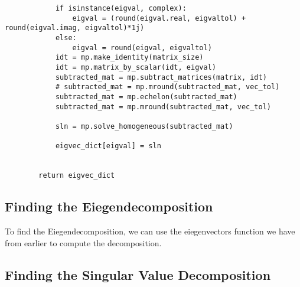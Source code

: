 \documentclass[12pt, a4paper]{article}
\begin{document}
\begin{lstlisting}
            if isinstance(eigval, complex):
                eigval = (round(eigval.real, eigvaltol) + round(eigval.imag, eigvaltol)*1j)
            else:
                eigval = round(eigval, eigvaltol)
            idt = mp.make_identity(matrix_size)
            idt = mp.matrix_by_scalar(idt, eigval)
            subtracted_mat = mp.subtract_matrices(matrix, idt)
            # subtracted_mat = mp.mround(subtracted_mat, vec_tol)
            subtracted_mat = mp.echelon(subtracted_mat)
            subtracted_mat = mp.mround(subtracted_mat, vec_tol)

            sln = mp.solve_homogeneous(subtracted_mat)
        
            eigvec_dict[eigval] = sln
        

        return eigvec_dict
\end{lstlisting}

\subsection{Finding the Eiegendecomposition}

To find the Eiegendecomposition, we can use the eiegenvectors function we have from earlier to compute the decomposition.


\subsection{Finding the Singular Value Decomposition}
\end{document}
